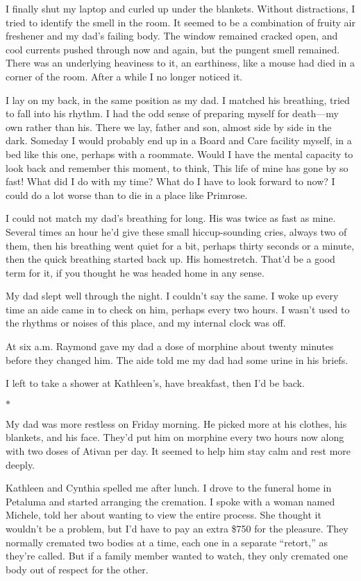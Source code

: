 \documentclass[12pt]{book}
\begin{document}
I finally shut my laptop and curled up under the blankets. Without distractions, I tried to identify the smell in the room. It seemed to be a combination of fruity air freshener and my dad's failing body. The window remained cracked open, and cool currents pushed through now and again, but the pungent smell remained. There was an underlying heaviness to it, an earthiness, like a mouse had died in a corner of the room. After a while I no longer noticed it.

I lay on my back, in the same position as my dad. I matched his breathing, tried to fall into his rhythm. I had the odd sense of preparing myself for death---my own rather than his. There we lay, father and son, almost side by side in the dark. Someday I would probably end up in a Board and Care facility myself, in a bed like this one, perhaps with a roommate. Would I have the mental capacity to look back and remember this moment, to think, This life of mine has gone by so fast! What did I do with my time? What do I have to look forward to now? I could do a lot worse than to die in a place like Primrose.

I could not match my dad's breathing for long. His was twice as fast as mine. Several times an hour he'd give these small hiccup-sounding cries, always two of them, then his breathing went quiet for a bit, perhaps thirty seconds or a minute, then the quick breathing started back up. His homestretch. That'd be a good term for it, if you thought he was headed home in any sense.

My dad slept well through the night. I couldn't say the same. I woke up every time an aide came in to check on him, perhaps every two hours. I wasn't used to the rhythms or noises of this place, and my internal clock was off.

At six a.m. Raymond gave my dad a dose of morphine about twenty minutes before they changed him. The aide told me my dad had some urine in his briefs.

I left to take a shower at Kathleen's, have breakfast, then I'd be back.

\begin{center}$*$\end{center}

My dad was more restless on Friday morning. He picked more at his clothes, his blankets, and his face. They'd put him on morphine every two hours now along with two doses of Ativan per day. It seemed to help him stay calm and rest more deeply.

Kathleen and Cynthia spelled me after lunch. I drove to the funeral home in Petaluma and started arranging the cremation. I spoke with a woman named Michele, told her about wanting to view the entire process. She thought it wouldn't be a problem, but I'd have to pay an extra \$750 for the pleasure. They normally cremated two bodies at a time, each one in a separate ``retort,'' as they're called. But if a family member wanted to watch, they only cremated one body out of respect for the other.
\end{document}
